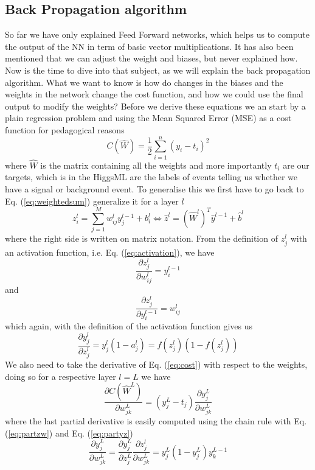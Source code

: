 \documentclass[14pt, a4paper]{book}
\begin{document}
\subsection{Back Propagation algorithm}
So far we have only explained Feed Forward networks, which helps us to compute the output of the NN in term of basic vector multiplications. It has also been mentioned that we can adjust the weight and biases, but never explained how. Now is the time to dive into that subject, as we will explain the back propagation algorithm. What we want to know is how do changes in the biases and the weights in the network change the cost function, and how we could use the final output to modify the weights? Before we derive these equations we an start by a plain regression problem and using the Mean Squared Error (MSE) as a cost function for pedagogical reasons
\begin{equation}\label{eq:cost}
    C(\hat{W})=\frac{1}{2}\sum_{i=1}^n(y_i-t_i)^2
\end{equation}
where $\hat{W}$ is the matrix containing all the weights and more importantly $t_i$ are our targets, which is in the HiggsML are the labels of events telling us whether we have a signal or background event. To generalise this we first have to go back to Eq. (\ref{eq:weightedsum}) generalize it for a layer $l$
$$
    z_i^l=\sum_{j=1}^Mw^l_{ij}y^{l-1}_j + b^l_i \Leftrightarrow \hat{z}^l=\left(\hat{W}^l\right)^T\hat{y}^{l-1} + \hat{b}^l
$$
where the right side is written on matrix notation. From the definition of $z_j^l$ with an activation function, i.e. Eq. (\ref{eq:activation}), we have
\begin{equation}\label{eq:partzw}
    \frac{\partial z_j^l}{\partial w_{ij}^l} = y_i^{l-1}
\end{equation}
and
$$
\frac{\partial z_j^l}{\partial y_i^{l-1}} = w_{ij}^l
$$
which again, with the definition of the activation function gives us
\begin{equation}\label{eq:partyz}
    \frac{\partial y^l_j}{\partial z_j^{l}} = y_j^l(1-a_j^l)=f(z_j^l)(1-f(z_j^l))
\end{equation}
We also need to take the derivative of Eq. (\ref{eq:cost}) with respect to the weights, doing so for a respective layer $l=L$ we have
$$
    \frac{\partial C(\hat W ^L) }{\partial w_{jk}^L}=\left(y_j^L-t_j\right)\frac{\partial y_j^L}{\partial w_{jk}^L}
$$
where the last partial derivative is easily computed using the chain rule with Eq. (\ref{eq:partzw}) and Eq. (\ref{eq:partyz})
$$
\frac{\partial y_j^L}{\partial w_{jk}^L} = \frac{\partial y^L_j}{\partial z_j^{L}}\frac{\partial z_j^l}{\partial w_{jk}^L} = y_j^L(1-y_j^L)y_k^{L-1}
$$
\end{document}
